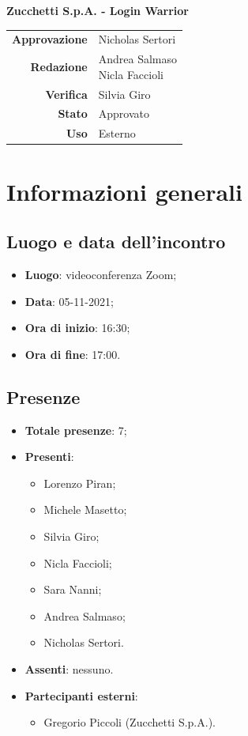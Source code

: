 \documentclass[11pt]{article}
\begin{document}
\begin{titlepage}
\begin{center}
			\large
			\textbf{Zucchetti S.p.A. - Login Warrior}\\
			
			\vfill
			
			\begin{tabular}{r|l}
				\textbf{Approvazione} &  Nicholas Sertori\\
				\textbf{Redazione} &  \parbox[t]{3.5cm}{Andrea Salmaso \\Nicla Faccioli}\\
				\textbf{Verifica} &  Silvia Giro\\
				\textbf{Stato} & Approvato \\
				\textbf{Uso} & Esterno
			\end{tabular}
			\vfill
			
		\end{center}
	\end{titlepage}

	\newpage

	\section{Informazioni generali}
	\subsection{Luogo e data dell'incontro}
	\begin{itemize}
		\item \textbf{Luogo}: videoconferenza Zoom;
		\item \textbf{Data}: 05-11-2021;
		\item \textbf{Ora di inizio}: 16:30;
		\item \textbf{Ora di fine}: 17:00.
	\end{itemize}
	
	\subsection{Presenze}
	\begin{itemize}
		\item \textbf{Totale presenze}: 7;
		\item \textbf{Presenti}:
		\begin{itemize}
			\item Lorenzo Piran;
			\item Michele Masetto;
			\item Silvia Giro;
			\item Nicla Faccioli;
			\item Sara Nanni;
			\item Andrea Salmaso;
			\item Nicholas Sertori.
		\end{itemize}
		\item \textbf{Assenti}: nessuno.
		\item \textbf{Partecipanti esterni}:
		\begin{itemize}
			\item Gregorio Piccoli (Zucchetti S.p.A.).
		\end{itemize}
	\end{itemize}
\end{document}
